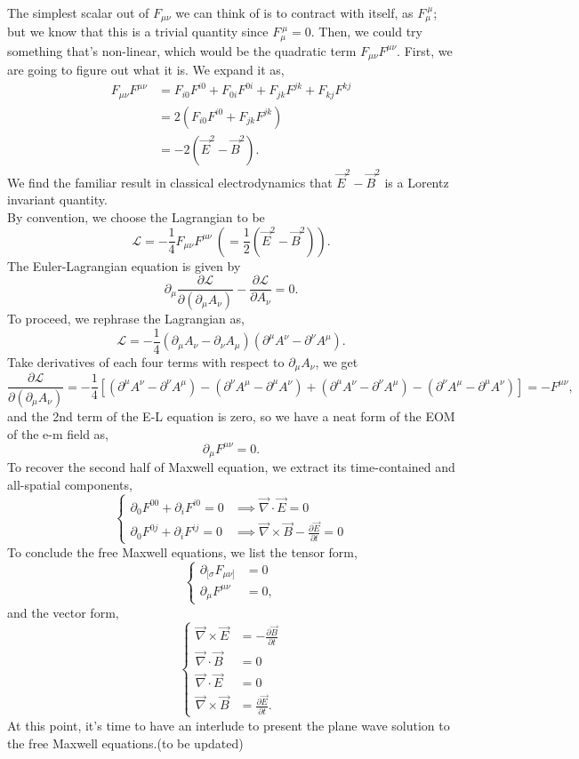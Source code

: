 \documentclass{article}
\newcommand{\be}{\begin{equation}}
\newcommand{\ee}{\end{equation}}
\newcommand{\bs}{\be\begin{split}}
\newcommand{\p}{\partial}
\newcommand{\1}{\left}
\newcommand{\2}{\right}
\newcommand{\ma}{\mathcal}
\newcommand{\m}{\mu}
\newcommand{\n}{\nu}
\begin{document}
The simplest scalar out of $F_{\m\n}$ we can think of is to contract with itself, as $F_\m^{\ \m}$; but we know that this is a trivial quantity since $F_\m^{\ \m} = 0$. Then, we could try something that's non-linear, which would be the quadratic term $F_{\m\n} F^{\m\n}$. First, we are going to figure out what it is. We expand it as,
\bs
F_{\m\n} F^{\m\n} &= F_{i0} F^{i0} + F_{0i} F^{0i} + F_{jk}F^{jk} +F_{kj}F^{kj}\\
&= 2(F_{i0} F^{i0}+F_{jk}F^{jk})\\
&=-2(\vec E^2 - \vec B^2).
\end{split}\ee
We find the familiar result in classical electrodynamics that $\vec E^2 - \vec B^2$ is a Lorentz invariant quantity.\\
By convention, we choose the Lagrangian to be
\be
\ma L =-\frac1 4 F_{\m\n} F^{\m\n} \ \1(=\frac1 2 (\vec E^2 - \vec B^2)\2).
\ee
The Euler-Lagrangian equation is given by
\be
\p_\m \frac{\p\ma L}{\p(\p_\m A_\n)} - \frac{\p\ma L}{\p A_\n} = 0.
\ee
To proceed, we rephrase the Lagrangian as,
\be
\ma L =-\frac1 4 (\p_\m A_\n-\p_\n A_\m)(\p^\m A^\n-\p^\n A^\m).
\ee
Take derivatives of each four terms with respect to $\p_\m A_\n$, we get
\be
\frac{\p\ma L}{\p(\p_\m A_\n)} = -\frac1 4 [(\p^\m A^\n-\p^\n A^\m) - (\p^\n A^\m-\p^\m A^\n) + (\p^\m A^\n-\p^\n A^\m) - (\p^\n A^\m-\p^\m A^\n)] = -F^{\m\n},
\ee
and the 2nd term of the E-L equation is zero, so we have a neat form of the EOM of the e-m field as,
\be
\p_\m F^{\m\n}=0.
\ee
To recover the second half of Maxwell equation, we extract its time-contained and all-spatial components,
\be\1\{\begin{split}
\p_0 F^{00}+\p_i F^{i0}=0 &\implies \vec\nabla\cdot\vec E=0\\
\p_0 F^{0j}+\p_i F^{ij}=0  &\implies \vec\nabla\times\vec B - \frac{\p\vec E}{\p t}=0
\end{split}\2.\ee
To conclude the free Maxwell equations, we list the tensor form,
\be\1\{\begin{split}
\p_{[\sigma} F_{\m\n]} &= 0\\
\p_\m F^{\m\n}  &=0,
\end{split}\2.\ee
and the vector form,
\be 
\1\{
\begin{split}
\vec \nabla \times \vec E &=- \frac{\p \vec B}{\p t}  \\
\vec \nabla \cdot \vec B &= 0 \\
\vec\nabla\cdot\vec E&=0\\
\vec\nabla\times\vec B &= \frac{\p\vec E}{\p t}.
\end{split}
\2.
\ee
At this point, it's time to have an interlude to present the plane wave solution to the free Maxwell equations.(to be updated)\\
\end{document}
